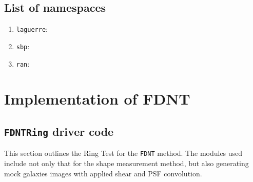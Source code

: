\documentclass[useAMS,usenatbib,usegraphicx]{mn2e}
\begin{document}
\subsection{List of namespaces}
\begin{enumerate}
\item {\tt laguerre}: 
\item {\tt sbp}: 
\item {\tt ran}: 
\end{enumerate}

\section{Implementation of FDNT}

\subsection{{\tt FDNTRing} driver code}
This section outlines the Ring Test for the {\tt FDNT} method.  
The modules used include not only that for the shape measurement method, but also
generating mock galaxies images with applied shear and PSF convolution.
\end{document}
